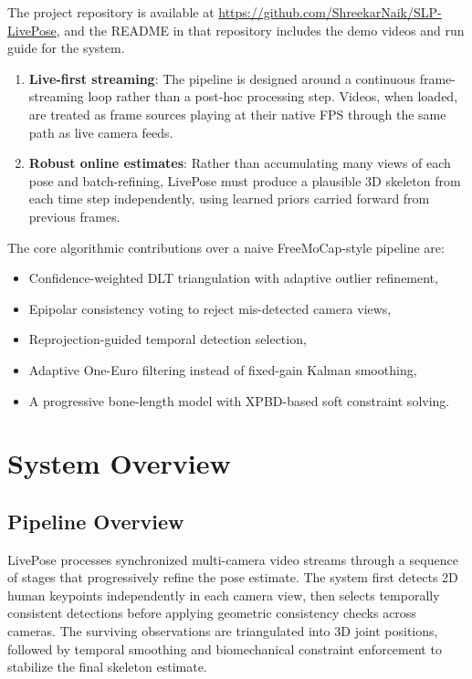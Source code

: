 \documentclass[11pt,a4paper]{article}
\begin{document}
\noindent The project repository is available at \url{https://github.com/ShreekarNaik/SLP-LivePose},
and the README in that repository includes the demo videos and run guide for the system.

\begin{enumerate}
  \item \textbf{Live-first streaming}: The pipeline is designed around a continuous
    frame-streaming loop rather than a post-hoc processing step. Videos, when loaded,
    are treated as frame sources playing at their native FPS through the same path as
    live camera feeds.
  \item \textbf{Robust online estimates}: Rather than accumulating many views of each
    pose and batch-refining, LivePose must produce a plausible 3D skeleton from each
    time step independently, using learned priors carried forward from previous frames.
\end{enumerate}

\noindent The core algorithmic contributions over a naive FreeMoCap-style pipeline are:

\begin{itemize}
  \item Confidence-weighted DLT triangulation with adaptive outlier refinement,
  \item Epipolar consistency voting to reject mis-detected camera views,
  \item Reprojection-guided temporal detection selection,
  \item Adaptive One-Euro filtering instead of fixed-gain Kalman smoothing,
  \item A progressive bone-length model with XPBD-based soft constraint solving.
\end{itemize}

\section{System Overview}

\subsection{Pipeline Overview}

LivePose processes synchronized multi-camera video streams through a sequence of
stages that progressively refine the pose estimate. The system first detects 2D
human keypoints independently in each camera view, then selects temporally
consistent detections before applying geometric consistency checks across cameras.
The surviving observations are triangulated into 3D joint positions, followed by
temporal smoothing and biomechanical constraint enforcement to stabilize the final
skeleton estimate.
\end{document}
